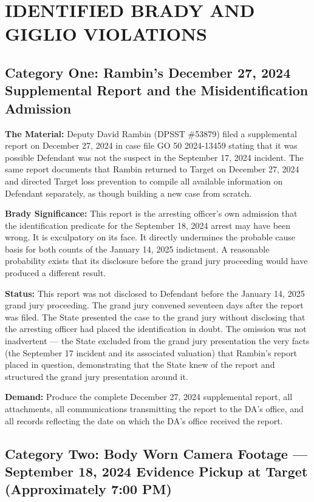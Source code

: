 \documentclass[12pt,letterpaper]{extarticle}
\begin{document}
	\section{IDENTIFIED BRADY AND GIGLIO VIOLATIONS}
	
	\subsection{Category One: Rambin's December 27, 2024 Supplemental Report and
		the Misidentification Admission}
	
	\textbf{The Material:} Deputy David Rambin (DPSST \#53879) filed a supplemental
	report on December 27, 2024 in case file GO 50 2024-13459 stating that it was
	possible Defendant was not the suspect in the September 17, 2024 incident. The
	same report documents that Rambin returned to Target on December 27, 2024 and
	directed Target loss prevention to compile all available information on Defendant
	separately, as though building a new case from scratch.
	
	\textbf{Brady Significance:} This report is the arresting officer's own admission
	that the identification predicate for the September 18, 2024 arrest may have been
	wrong. It is exculpatory on its face. It directly undermines the probable cause
	basis for both counts of the January 14, 2025 indictment. A reasonable probability
	exists that its disclosure before the grand jury proceeding would have produced a
	different result.
	
	\textbf{Status:} This report was not disclosed to Defendant before the January 14,
	2025 grand jury proceeding. The grand jury convened seventeen days after the report
	was filed. The State presented the case to the grand jury without disclosing that
	the arresting officer had placed the identification in doubt. The omission was not
	inadvertent --- the State excluded from the grand jury presentation the very facts
	(the September 17 incident and its associated valuation) that Rambin's report
	placed in question, demonstrating that the State knew of the report and structured
	the grand jury presentation around it.
	
	\textbf{Demand:} Produce the complete December 27, 2024 supplemental report,
	all attachments, all communications transmitting the report to the DA's office,
	and all records reflecting the date on which the DA's office received the report.
	
	\subsection{Category Two: Body Worn Camera Footage --- September 18, 2024
		Evidence Pickup at Target (Approximately 7:00 PM)}
	
\end{document}
